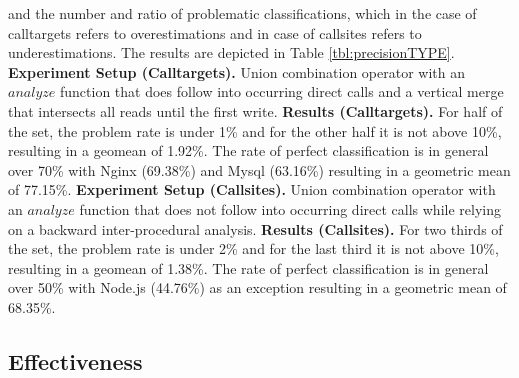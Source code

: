 and the number and ratio of problematic classifications, which in the case of calltargets refers to overestimations and in case of callsites refers to underestimations. The results are depicted in Table \ref{tbl:precisionTYPE}.
\textbf{Experiment Setup (Calltargets).} Union combination operator with an $analyze$ function that does follow into occurring direct calls and a vertical merge that intersects all reads until the first write.
\textbf{Results (Calltargets).} For half of the set, the problem rate is under 1\% and for the other half it is not above 10\%, resulting in a geomean of 1.92\%. The rate of perfect classification is in general over 70\% with Nginx (69.38\%) and Mysql (63.16\%) resulting in a geometric mean of 77.15\%.
\textbf{Experiment Setup (Callsites).} Union combination operator with an $analyze$ function that does not follow into occurring direct calls while relying on a backward inter-procedural analysis.
\textbf{Results (Callsites).} For two thirds of the set, the problem rate is under 2\% and for the last third it is not above 10\%, resulting in a geomean of 1.38\%. The rate of perfect classification is in general over 50\% with Node.js (44.76\%) as an exception resulting in a geometric mean of 68.35\%.


%
%
%
%
\subsection{Effectiveness}
\label{section:typeshieldeffectiveness}


